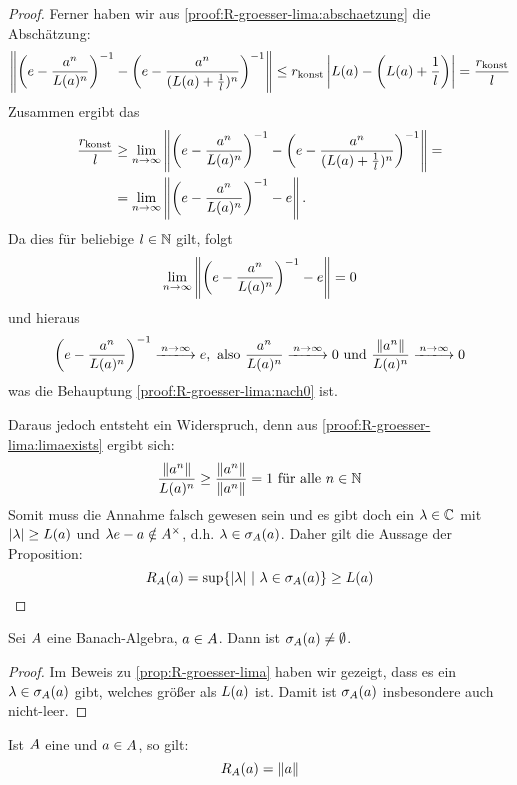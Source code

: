 \begin{proof}
Ferner haben wir aus \ref{proof:R-groesser-lima:abschaetzung} die Abschätzung:
	\[\left\lVert\left(e - \frac{a^n}{L(a)^n}\right)^{-1} - \left(e - \frac{a^n}{(L(a) + \frac{1}{l})^n}\right)^{-1}\right\rVert \leq r_\textup{konst}\left|L(a)-\left(L(a)+\frac{1}{l}\right)\right| = \frac{r_\textup{konst}}{l}\]
Zusammen ergibt das
	\begin{align*}\frac{r_\textup{konst}}{l} &\geq \underset{n\to\infty}{\lim} \left\lVert\left(e - \frac{a^n}{L(a)^n}\right)^{-1} - \left(e - \frac{a^n}{(L(a) + \frac{1}{l})^n}\right)^{-1}\right\rVert = \\
	&= \underset{n\to\infty}{\lim} \left\lVert\left(e - \frac{a^n}{L(a)^n}\right)^{-1} - e\right\rVert.
	\end{align*}
Da dies für beliebige $l \in \mathbb{N}$ gilt, folgt
	\[\underset{n\to\infty}{\lim} \left\lVert\left(e - \frac{a^n}{L(a)^n}\right)^{-1} - e\right\rVert = 0\]
und hieraus
	\[\left(e - \frac{a^n}{\lima^n}\right)^{-1} \xlongrightarrow{n\to\infty} e, \text{ also } \frac{a^n}{\lima^n} \xlongrightarrow{n\to\infty} 0 \text{ und } \frac{\norm{a^n}}{\lima^n} \xlongrightarrow{n\to\infty} 0\]
was die Behauptung \ref{proof:R-groesser-lima:nach0} ist.	

Daraus jedoch entsteht ein Widerspruch, denn aus \ref{proof:R-groesser-lima:limaexists} ergibt sich: 
	\[\frac{\left\lVert a^n\right\rVert}{L(a)^n} \geq \frac{\left\lVert a^n\right\rVert}{\left\lVert a^n\right\rVert} = 1 \text{ für alle } n\in \mathbb{N}\]
Somit muss die Annahme falsch gewesen sein und es gibt doch ein $\lambda \in \mathbb{C}$ mit $|\lambda| \geq L(a)$ und $\lambda e - a \notin A^\times$, d.h. $\lambda \in \sigma_A(a)$. Daher gilt die Aussage der Proposition:
	\[R_A(a) = \sup\{|\lambda| ~|~ \lambda \in \sigma_A(a)\} \geq L(a)\]
\end{proof}


\begin{kor}\label{kor:spektrum-nicht-leer}
Sei $A$ eine Banach-Algebra, $a \in A$. Dann ist $\sigma_A(a) \neq \emptyset$.
\end{kor}

\begin{proof}
Im Beweis zu \cref{prop:R-groesser-lima} haben wir gezeigt, dass es ein $\lambda \in \sigma_A(a)$ gibt, welches größer als $L(a)$ ist. Damit ist $\sigma_A(a)$ insbesondere auch nicht-leer.
\end{proof}

\begin{prop}\label{prop:R-gleich-Norm}
Ist $A$ eine \CAlg{} und $a \in A$, so gilt: 
	\[R_A(a) = \left\lVert a\right\rVert\]
\end{prop}

